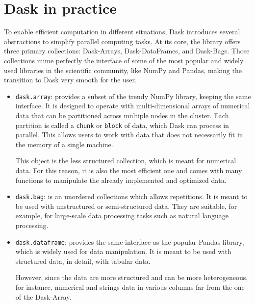 \section{Dask in practice}\label{sec:daskcloud}

To enable efficient computation in different situations, Dask introduces several
abstractions to simplify parallel computing tasks.  At its core, the library
offers three primary collections: Dask-Arrays, Dask-DataFrames, and Dask-Bags.
Those collections mime perfectly the interface of some of the most popular and
widely used libraries in the scientific community, like NumPy and Pandas, making
the transition to Dask very smooth for the user.

\begin{itemize}
  \itemsep0em
  \item \texttt{dask.array}: provides a subset of the
    trendy NumPy library, keeping the same interface. It is designed to operate
    with multi-dimensional arrays of numerical data that can be partitioned
    across multiple nodes in the cluster. Each partition is called a
    \texttt{chunk} or \texttt{block} of data, which Dask can process in parallel.
    This allows users to work with data that does not necessarily fit in the memory
    of a single machine\cite{daskdoc-array}.

    This object is the less structured collection, which is meant for numerical data.
    For this reason, it is also the most efficient one and comes with many
    functions to manipulate the already implemented and optimized data.
  \item \texttt{dask.bag}: is an unordered collections which allows repetitions.
    It is meant to be used with unstructured or semi-structured data. They are
    suitable, for example, for large-scale data processing tasks such as natural
    language processing.
  \item \texttt{dask.dataframe}: provides the same
    interface as the popular Pandas library, which is widely used for data
    manipulation. It is meant to be used with structured data, in detail, with
    tabular data\cite{daskdoc-dataframe}.

    However, since the data are more structured and can be more heterogeneous,
    for instance, numerical and strings data in various columns far from the one of
    the Dask-Array\cite{dask2015}.
\end{itemize}

